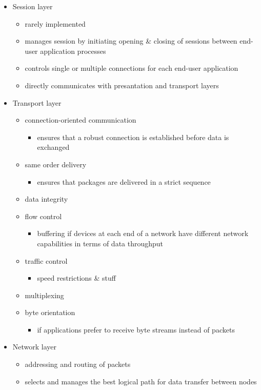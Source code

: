 \documentclass[a4paper,12pt]{article}
\begin{document}
\begin{itemize}
	\item Session layer
	\begin{itemize}
		\item  rarely implemented
		\item  manages session by initiating opening \& closing of sessions between end-user application processes
		\item  controls single or multiple connections for each end-user application
		\item  directly communicates with presantation and transport layers
	\end{itemize}

	\item Transport layer
	\begin{itemize}
		\item  connection-oriented communication
		\begin{itemize}
			\item ensures that a robust connection is established before data is exchanged
		\end{itemize}
		\item  same order delivery
		\begin{itemize}
			\item  ensures that packages are delivered in a strict sequence
		\end{itemize}
		\item  data integrity
		\item  flow control
		\begin{itemize}
			\item  buffering if devices at each end of a network have different network capabilities in terms of data throughput 
		\end{itemize}	
		\item  traffic control
		\begin{itemize}
			\item  speed restrictions \& stuff
		\end{itemize}	
		\item  multiplexing
		\item  byte orientation
		\begin{itemize}
			\item if applications prefer to receive byte streams instead of packets 
		\end{itemize}  
	\end{itemize}

	\item Network layer
	\begin{itemize}
		\item  addressing and routing of packets
		\item  selects and manages the best logical path for data transfer between nodes
	\end{itemize}


\end{itemize}
\end{document}

